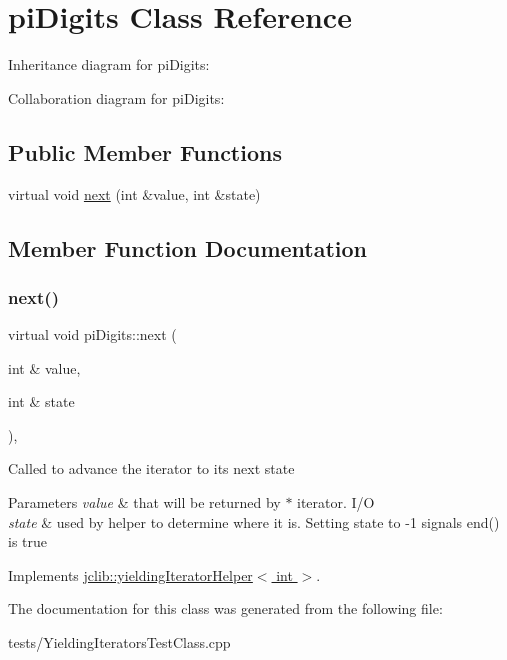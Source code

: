 \hypertarget{classpiDigits}{}\section{pi\+Digits Class Reference}
\label{classpiDigits}


Inheritance diagram for pi\+Digits\+:


Collaboration diagram for pi\+Digits\+:
\subsection*{Public Member Functions}
\begin{DoxyCompactItemize}
\item 
virtual void \hyperlink{classpiDigits_a3957780a86699d5b112cb2de9d465e84}{next} (int \&value, int \&state)
\end{DoxyCompactItemize}


\subsection{Member Function Documentation}
\mbox{\label{classpiDigits_a3957780a86699d5b112cb2de9d465e84}} 
\subsubsection{\texorpdfstring{next()}{next()}}
{\footnotesize\ttfamily virtual void pi\+Digits\+::next (\begin{DoxyParamCaption}\item[{int \&}]{value,  }\item[{int \&}]{state }\end{DoxyParamCaption})\hspace{0.3cm}{\ttfamily [inline]}, {\ttfamily [virtual]}}

Called to advance the iterator to its next state 
\begin{DoxyParams}{Parameters}
{\em value} & that will be returned by $\ast$ iterator. I/O \\
\hline
{\em state} & used by helper to determine where it is. Setting state to -\/1 signals end() is true \\
\hline
\end{DoxyParams}


Implements \hyperlink{classjclib_1_1yieldingIteratorHelper_a620c17e7eb8ed695e3fb9add01da576d}{jclib\+::yielding\+Iterator\+Helper$<$ int $>$}.



The documentation for this class was generated from the following file\+:\begin{DoxyCompactItemize}
\item 
tests/Yielding\+Iterators\+Test\+Class.\+cpp\end{DoxyCompactItemize}
